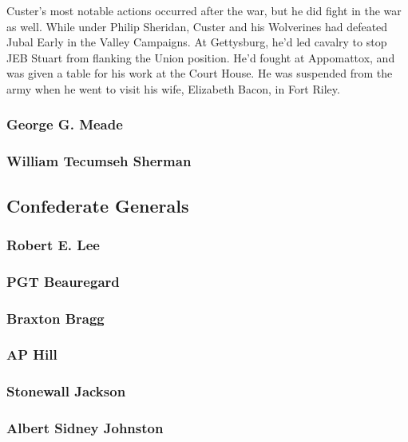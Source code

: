 Custer's most notable actions occurred after the war, but he did fight in the war as well.
While under Philip Sheridan, Custer and his Wolverines had defeated Jubal Early in the Valley Campaigns.
At Gettysburg, he'd led cavalry to stop JEB Stuart from flanking the Union position.
He'd fought at Appomattox, and was given a table for his work at the Court House.
He was suspended from the army when he went to visit his wife, Elizabeth Bacon, in Fort Riley.

\subsubsection*{George G. Meade}

\subsubsection*{William Tecumseh Sherman}

\subsection*{Confederate Generals}

\subsubsection*{Robert E. Lee}

\subsubsection*{PGT Beauregard}

\subsubsection*{Braxton Bragg}

\subsubsection*{AP Hill}

\subsubsection*{Stonewall Jackson}

\subsubsection*{Albert Sidney Johnston}

